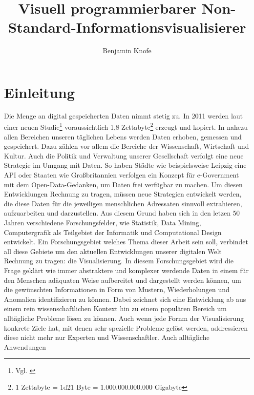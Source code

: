 \documentclass[a4paper, 12pt, DIVcalc, onepage, pdftex, headsepline, footsepline]{scrreprt}
\begin{document}
\title{Visuell programmierbarer Non-Standard-Informationsvisualisierer}
\author{Benjamin Knofe}
\subject{Diplomarbeit}
\publishers{Hochschule für Technik, Wirtschaft und Kultur Leipzig}
\dedication{Dank an \\ Pyry Jahkola, Philip Whitfield}
\maketitle
\tableofcontents

\chapter{Einleitung}
\label{cha:Einleitung}
Die Menge an digital gespeicherten Daten nimmt stetig zu. In 2011 werden laut einer neuen
Studie\footnote{Vgl. \citep{EMC}} voraussichtlich 1,8 Zettabyte\footnote{1 Zettabyte = \num{1d21}
Byte = 1.000.000.000.000 Gigabyte} erzeugt und kopiert. In nahezu allen Bereichen unseren
täglichen Lebens werden Daten erhoben, gemessen und gespeichert. Dazu zählen vor allem die Bereiche
der Wissenschaft, Wirtschaft und Kultur. Auch die Politik und Verwaltung unserer Gesellschaft
verfolgt eine neue Strategie im Umgang mit Daten. So haben Städte wie beispielsweise Leipzig eine 
API oder Staaten wie Großbritannien verfolgen ein Konzept für e-Government mit dem
Open-Data-Gedanken, um Daten frei verfügbar zu machen. Um diesen Entwicklungen Rechnung zu tragen,
müssen neue Strategien entwickelt werden, die diese Daten für die jeweiligen menschlichen Adressaten
sinnvoll extrahieren, aufzuarbeiten und darzustellen. Aus diesem Grund haben sich in den letzen 50
Jahren verschiedene Forschungsfelder, wie Statistik, Data Mining, Computergrafik als Teilgebiet der
Informatik und Computational Design entwickelt. Ein Forschungsgebiet welches Thema dieser Arbeit
sein soll, verbindet all diese Gebiete um den aktuellen Entwicklungen unserer digitalen Welt
Rechnung zu tragen: die Visualisierung. In diesem Forschungsgebiet wird die Frage geklärt wie immer
abstraktere und komplexer werdende Daten in einem für den Menschen adäquaten Weise aufbereitet und
dargestellt werden können, um die gewünschten Informationen in Form von Mustern, Wiederholungen und
Anomalien identifizieren zu können. Dabei zeichnet sich eine Entwicklung ab aus einem rein
wissenschaftlichen Kontext hin zu einem populären Bereich um alltägliche Probleme lösen zu können.
Auch wenn jede Fornm der Visualisierung konkrete Ziele hat, mit denen sehr spezielle Probleme gelöst
werden, addressieren diese nicht mehr nur Experten und Wissenschaftler. Auch alltägliche Anwendungen
\end{document}
